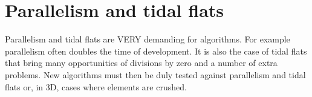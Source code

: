\section{Parallelism and tidal flats}

Parallelism and tidal flats are VERY demanding for algorithms. For example
parallelism often doubles the time of development. It is also the case of tidal
flats that bring many opportunities of divisions by zero and a number of extra
problems. New algorithms must then be duly tested against parallelism and tidal
flats or, in 3D, cases where elements are crushed.
%
